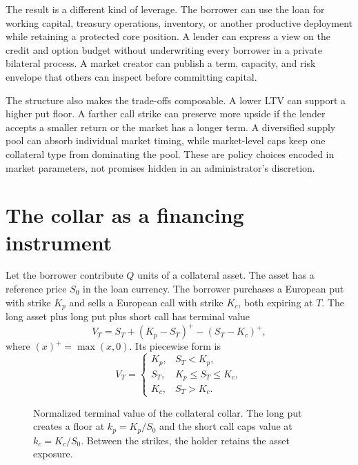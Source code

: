 \documentclass[11pt,oneside]{article}
\begin{document}
The result is a different kind of leverage. The borrower can use the loan for
working capital, treasury operations, inventory, or another productive
deployment while retaining a protected core position. A lender can express a
view on the credit and option budget without underwriting every borrower in a
private bilateral process. A market creator can publish a term, capacity, and
risk envelope that others can inspect before committing capital.

The structure also makes the trade-offs composable. A lower LTV can support a
higher put floor. A farther call strike can preserve more upside if the lender
accepts a smaller return or the market has a longer term. A diversified supply
pool can absorb individual market timing, while market-level caps keep one
collateral type from dominating the pool. These are policy choices encoded in
market parameters, not promises hidden in an administrator's discretion.

\section{The collar as a financing instrument}

Let the borrower contribute $Q$ units of a collateral asset. The asset has a reference price $S_0$ in the loan currency. The borrower purchases a European put with strike $K_p$ and sells a European call with strike $K_c$, both expiring at $T$. The long asset plus long put plus short call has terminal value
\[
V_T=S_T+(K_p-S_T)^+-(S_T-K_c)^+,
\]
where $(x)^+=\max(x,0)$. Its piecewise form is
\[
V_T=\begin{cases}
K_p, & S_T<K_p,\\
S_T, & K_p\leq S_T\leq K_c,\\
K_c, & S_T>K_c.
\end{cases}
\]

\begin{figure}[htbp]
\centering
{}
\caption{Normalized terminal value of the collateral collar. The long put creates a floor at $k_p=K_p/S_0$ and the short call caps value at $k_c=K_c/S_0$. Between the strikes, the holder retains the asset exposure.}
\label{fig:collar-payoff}
\end{figure}
\end{document}
